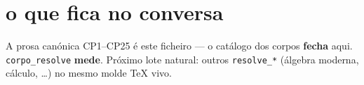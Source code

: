 \documentclass[11pt,a4paper]{article}
\newcommand{\code}[1]{\texttt{\small #1}}
\begin{document}
\section{o que fica no conversa}
A prosa canónica CP1--CP25 é este ficheiro --- o catálogo dos corpos
\textbf{fecha} aqui. \code{corpo\_resolve} \textbf{mede}.
Próximo lote natural: outros \code{resolve\_*} (álgebra moderna, cálculo, \ldots)
no mesmo molde TeX vivo.
\end{document}
